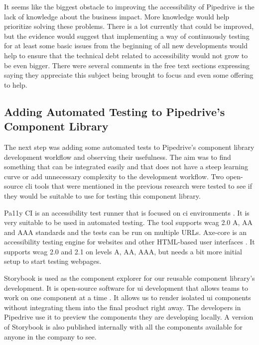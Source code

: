 \documentclass{master_thesis}
\begin{document}
It seems like the biggest obstacle to improving the accessibility of Pipedrive is the lack of knowledge about the business impact. More knowledge would help prioritize solving these problems. There is a lot currently that could be improved, but the evidence would suggest that implementing a way of continuously testing for at least some basic issues from the beginning of all new developments would help to ensure that the technical debt related to accessibility would not grow to be even bigger. There were several comments in the free text sections expressing saying they appreciate this subject being brought to focus and even some offering to help.

\subsection{Adding Automated Testing to Pipedrive's Component Library} \label{adding-a11y-tool}

The next step was adding some automated tests to Pipedrive's component library development workflow and observing their usefulness. The aim was to find something that can be integrated easily and that does not have a steep learning curve or add unnecessary complexity to the development workflow. Two open-source \ac{cli} tools that were mentioned in the previous research were tested to see if they would be suitable to use for testing this component library.

Pa11y CI is an accessibility test runner that is focused on \ac{ci} environments \citep{TeamPa11y2022}. It is very suitable to be used in automated testing. The tool supports \ac{wcag} 2.0 A, AA and AAA standards and the tests can be run on multiple URLs. Axe-core is an accessibility testing engine for websites and other HTML-based user interfaces \citep{Deque2023}. It supports \ac{wcag} 2.0 and 2.1 on levels A, AA, AAA, but needs a bit more initial setup to start testing webpages.

Storybook is used as the component explorer for our reusable component library's development. It is open-source software for \ac{ui} development that allows teams to work on one component at a time \citep{storybook}. It allows us to render isolated \ac{ui} components without integrating them into the final product right away. The developers in Pipedrive use it to preview the components they are developing locally. A version of Storybook is also published internally with all the components available for anyone in the company to see.
\end{document}
